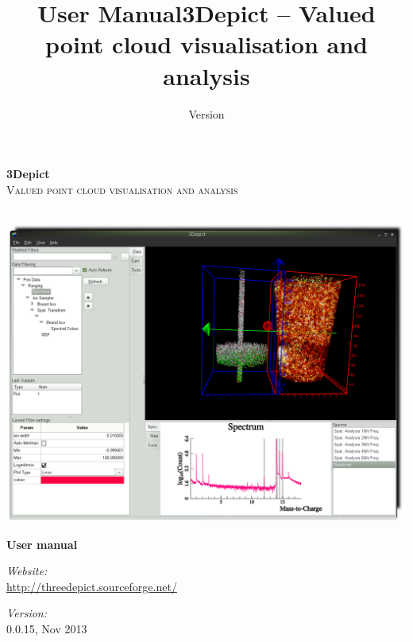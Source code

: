 \documentclass[10pt]{article}
\title{User Manual}
\date{Version}
\author{}
\begin{document}
\begin{titlepage}

\begin{center}
\vspace{3 cm}
\Huge \textbf{3Depict}\\[1.0cm]

\textsc{\Large Valued point cloud visualisation and analysis}\\
\hrulefill \\[1.0cm]

\begin{center}
 \includegraphics[width=\textwidth,keepaspectratio=true]{./figures/CoverImage.png}
\end{center}
\vspace{1.0 cm}


{ \Huge \bfseries User manual}\\[0.4cm]
\vspace{1.0 cm}


\begin{minipage}{0.5\textwidth}
\begin{flushleft} \large
\emph{Website:}\\
\url{http://threedepict.sourceforge.net/}\end{flushleft}
\end{minipage}
\begin{minipage}{0.3\textwidth}
\begin{flushright} \large
\emph{Version:} \\
 0.0.15, Nov 2013\end{flushright}
\end{minipage}

\vfill

\end{center}

\end{titlepage}
\clearpage
{}
\tableofcontents
\clearpage
{}
\title{3Depict -- Valued point cloud visualisation and analysis}
\end{document}
